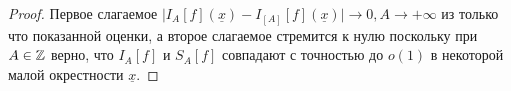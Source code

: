 \begin{proof}
Первое слагаемое $\bigl|I_{A}[f](\underline{x}) - I_{[A]}[f](\underline{x})\bigr| \rightarrow
 0, A \rightarrow +\infty$ из только что показанной оценки, а второе слагаемое стремится к нулю поскольку при $A \in \mathbb{Z}$ верно, что $I_A[f]$ и $S_A[f]$ совпадают с точностью до $o(1)$ в некоторой малой окрестности $\underline{x}$.
\end{proof}
